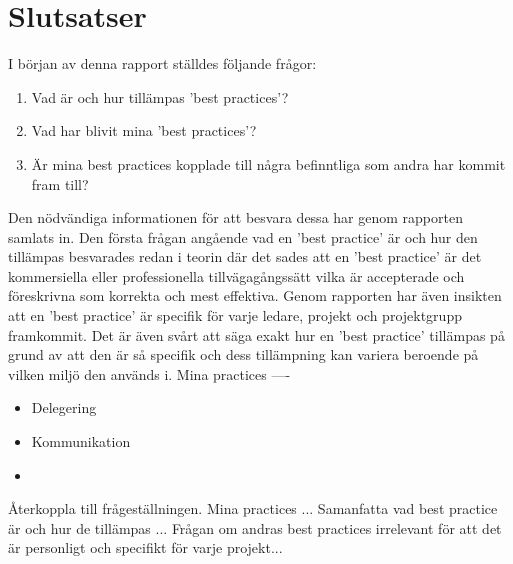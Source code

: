 \section{Slutsatser}
I början av denna rapport ställdes följande frågor:
\begin{enumerate}
		\item Vad är och hur tillämpas 'best practices'?
		\item Vad har blivit mina 'best practices'?
		\item Är mina best practices kopplade till några befinntliga som andra har kommit fram till?
\end{enumerate}
Den nödvändiga informationen för att besvara dessa har genom rapporten samlats in. Den första frågan angående vad en 'best practice' är och hur den tillämpas besvarades redan i teorin där det sades att en 'best practice' är det kommersiella eller professionella tillvägagångssätt vilka är accepterade och föreskrivna som korrekta och mest effektiva. Genom rapporten har även insikten att en 'best practice' är specifik för varje ledare, projekt och projektgrupp framkommit. Det är även svårt att säga exakt hur en 'best practice' tillämpas på grund av att den är så specifik och dess tillämpning kan variera beroende på vilken miljö den används i. 
\newline \newline 
Mina practices ----
\begin{itemize}
	\item Delegering
	\item Kommunikation
	\item
\end{itemize}
Återkoppla till frågeställningen.
\newline \newline
Mina practices ... 
\newline \newline
Samanfatta vad best practice är och hur de tillämpas ...
\newline \newline
Frågan om andras best practices irrelevant för att det är personligt och specifikt för varje projekt...